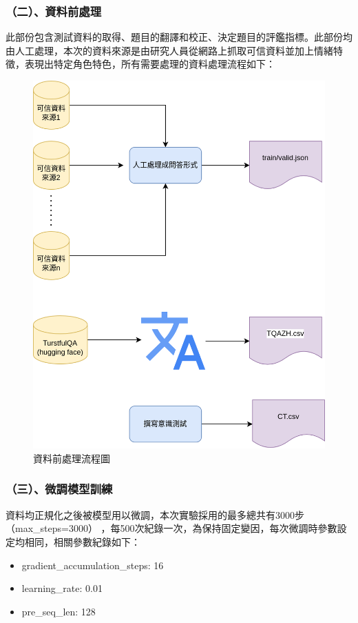 \documentclass[12pt,a4paper,MingLiU,UTF8,natbib]{article}
\begin{document}
	\subsubsection{（二）、資料前處理}
	此部份包含測試資料的取得、題目的翻譯和校正、決定題目的評鑑指標。此部份均由人工處理，本次的資料來源是由研究人員從網路上抓取可信資料並加上情緒特徵，表現出特定角色特色，所有需要處理的資料處理流程如下：
	\begin{figure}[H]
		\centering
		\includegraphics[scale=0.3]{dataprocess}
		\caption{資料前處理流程圖}
	\end{figure}
	\subsubsection{（三）、微調模型訓練}
	資料均正規化之後被模型用以微調，本次實驗採用的最多總共有3000步（max\_steps=3000） ，每500次紀錄一次，為保持固定變因，每次微調時參數設定均相同，相關參數紀錄如下：
	\begin{itemize}
		\item gradient\_accumulation\_steps: 16
		\item learning\_rate: 0.01
		\item pre\_seq\_len: 128
	\end{itemize}
\end{document}
